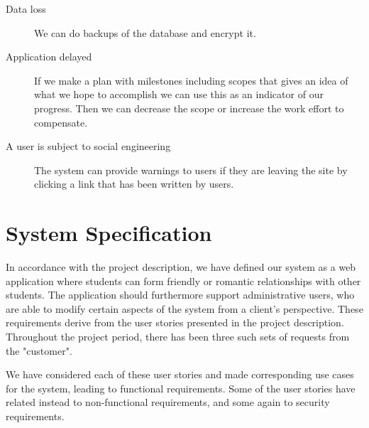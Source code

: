 \documentclass[a4paper]{article}
\begin{document}
\begin{description}
\item[Data loss]
We can do backups of the database and encrypt it.

\item[Application delayed]
If we make a plan with milestones including scopes that gives an idea of what we hope to accomplish we can use this as an indicator of our progress.
Then we can decrease the scope or increase the work effort to compensate.

\item[A user is subject to social engineering]
The system can provide warnings to users if they are leaving the site by clicking a link that has been written by users.

\end{description}


\section{System Specification}
In accordance with the project description, we have defined our system as a web application where students can form friendly or romantic relationships with other students. The application should furthermore support administrative users, who are able to modify certain aspects of the system from a client's perspective. These requirements derive from the user stories presented in the project description. Throughout the project period, there has been three such sets of requests from the "customer".

We have considered each of these user stories and made corresponding use cases for the system, leading to functional requirements. Some of the user stories have related instead to non-functional requirements, and some again to security requirements.
\end{document}
